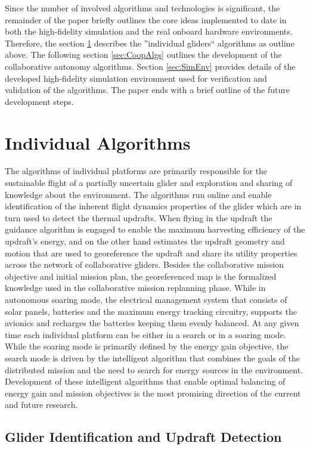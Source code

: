 \documentclass{ifacconf}
\begin{document}
Since the number of involved algorithms and technologies is significant, the remainder of the paper briefly outlines the core ideas implemented to date in both the high-fidelity simulation and the real onboard hardware environments. Therefore, the section \ref{sec:InAlgs} describes the ''individual gliders`` algorithms as outline above. The following section \ref{sec:CoopAlgs}  outlines the development of the collaborative autonomy algorithms. Section \ref{sec:SimEnv} provides details of the developed high-fidelity simulation environment used for verification and validation of the algorithms. The paper ends with a brief outline of the future development steps.

\section{Individual Algorithms}
\label{sec:InAlgs}

The algorithms of individual platforms are primarily responsible for the sustainable flight of a partially uncertain glider and exploration and sharing of knowledge about the environment. The algorithms run online and enable identification of the inherent flight dynamics properties of the glider which are in turn used to detect the thermal updrafts. When flying in the updraft the guidance algorithm is engaged to enable the maximum harvesting efficiency of the updraft's energy, and on the other hand estimates the updraft geometry and motion that are used to georeference the updraft and share its utility properties across the network of collaborative gliders. Besides the collaborative mission objective and initial mission plan, the georeferenced map is the formalized knowledge used in the collaborative mission replanning phase. While in autonomous soaring mode, the electrical management system that consists of solar panels, batteries and the maximum energy tracking circuitry, supports the avionics and recharges the batteries keeping them evenly balanced. At any given time each individual platform can be either in a search or in a soaring mode. While the soaring mode is primarily defined by the energy gain objective, the search mode is driven by the intelligent algorithm that combines the goals of the distributed mission and the need to search for energy sources in the environment. Development of these intelligent algorithms that enable optimal balancing of energy gain and mission objectives is the most promising direction of the current and future research.

\subsection{Glider Identification and Updraft Detection}
\label{subsec:SysID}
\end{document}
